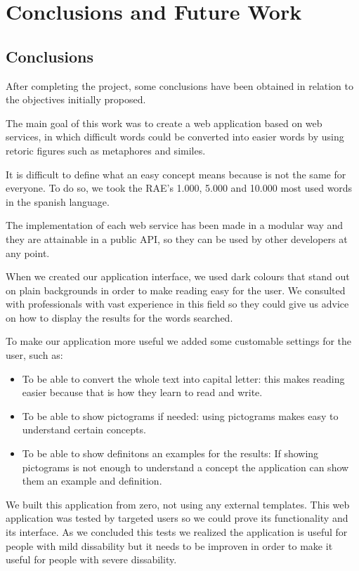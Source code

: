 \chapter{Conclusions and Future Work}
\label{cap:conclusions_futureWork}

\section{Conclusions}
\label{sec:conclusions}

After completing the project, some conclusions have been obtained in relation to the objectives initially proposed.

The main goal of this work was to create a web application based on web services, in which difficult words could be converted into easier words by using  retoric figures such as metaphores and similes.

It is difficult to define what an easy concept means because is not the same for everyone. To do so, we took the RAE's 1.000, 5.000 and 10.000 most used words in the spanish language.

The implementation of each web service has been made in a modular way and they are attainable in a public API, so they can be used by other developers at any point.

When we created our application interface, we used dark colours that stand out on plain backgrounds in order to make reading easy for the user. We consulted with professionals with vast experience in this field so they could give us advice on how to display the results for the words searched.

To make our application more useful we added some customable settings for the user, such as:

\begin{itemize}
	\item To be able to convert the whole text into capital letter: this makes reading easier because that is how they learn to read and write.
	\item To be able to show pictograms if needed: using pictograms makes easy to understand certain concepts.
	\item To be able to show definitons an examples for the results: If showing pictograms is not enough to understand a concept the application can show them an example and definition.
\end{itemize}

We built this application from zero, not using any external templates. This web application was tested by targeted users so we could prove its functionality and its interface. As we concluded this tests we realized the application is useful for people with mild dissability but it needs to be improven in order to make it useful for people with severe dissability.

